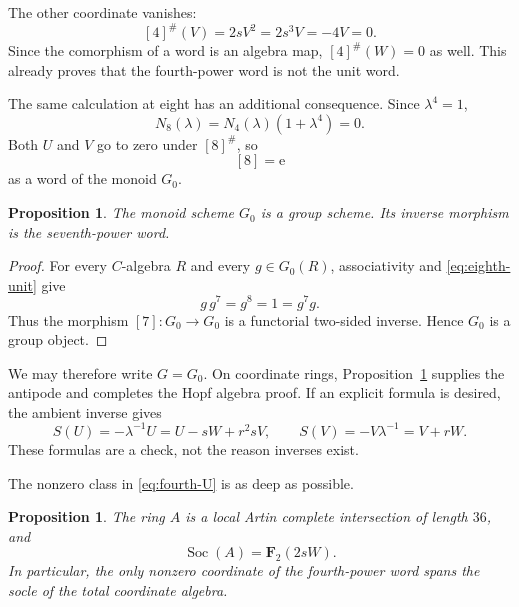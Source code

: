 \documentclass[11pt]{amsart}
\newtheorem{proposition}[theorem]{Proposition}
\theoremstyle{definition}
\theoremstyle{remark}
\newcommand{\F}{\mathbf F}
\newcommand{\Soc}{\operatorname{Soc}}
\newcommand{\unit}{\mathrm e}
\begin{document}
The other coordinate vanishes:
\begin{equation}\label{eq:fourth-V}
 [4]^\#(V)=2sV^2=2s^3V=-4V=0.
\end{equation}
Since the comorphism of a word is an algebra map,
\([4]^\#(W)=0\) as well.  This already proves that the fourth-power word is
not the unit word.

The same calculation at eight has an additional consequence.  Since
\(\lambda^4=1\),
\[
 N_8(\lambda)=N_4(\lambda)(1+\lambda^4)=0.
\]
Both \(U\) and \(V\) go to zero under \([8]^\#\), so
\begin{equation}\label{eq:eighth-unit}
 [8]=\unit
\end{equation}
as a word of the monoid \(G_0\).

\begin{proposition}\label{prop:inverse-by-seven}
The monoid scheme \(G_0\) is a group scheme.  Its inverse morphism is the
seventh-power word.
\end{proposition}

\begin{proof}
For every \(C\)-algebra \(R\) and every \(g\in G_0(R)\), associativity and
\eqref{eq:eighth-unit} give
\[
 g\,g^7=g^8=1=g^7g.
\]
Thus the morphism \([7]\colon G_0\to G_0\) is a functorial two-sided
inverse.  Hence \(G_0\) is a group object.
\end{proof}

We may therefore write \(G=G_0\).  On coordinate rings,
Proposition~\ref{prop:inverse-by-seven} supplies the antipode and completes
the Hopf algebra proof.  If an explicit formula is desired, the ambient
inverse gives
\begin{equation}\label{eq:explicit-antipode}
 S(U)=-\lambda^{-1}U=U-sW+r^2sV,
 \qquad
 S(V)=-V\lambda^{-1}=V+rW.
\end{equation}
These formulas are a check, not the reason inverses exist.

The nonzero class in \eqref{eq:fourth-U} is as deep as possible.

\begin{proposition}\label{prop:socle-A}
The ring \(A\) is a local Artin complete intersection of length \(36\), and
\begin{equation}\label{eq:socle-A}
 \Soc(A)=\F_2(2sW).
\end{equation}
In particular, the only nonzero coordinate of the fourth-power word spans
the socle of the total coordinate algebra.
\end{proposition}
\end{document}
